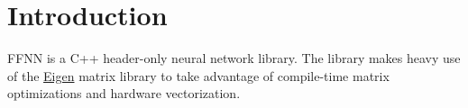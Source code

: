 \hypertarget{index_introduction}{}\section{Introduction}\label{index_introduction}
F\-F\-N\-N is a C++ header-\/only neural network library. The library makes heavy use of the \hyperlink{namespace_eigen}{Eigen} matrix library to take advantage of compile-\/time matrix optimizations and hardware vectorization. 